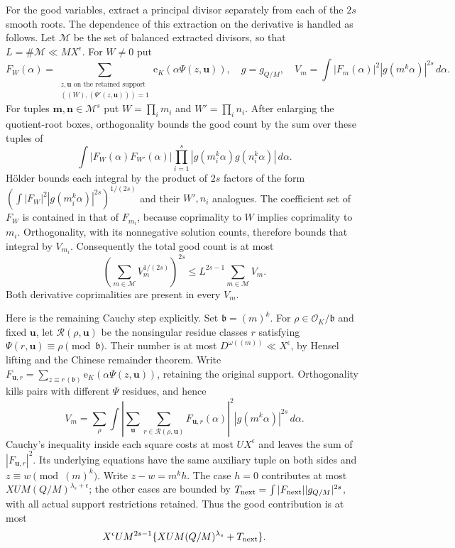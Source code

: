 \documentclass[11pt]{amsart}
\theoremstyle{definition}
\numberwithin{equation}{section}
\begin{document}
For the good variables, extract a principal divisor separately from each of the
$2s$ smooth roots.  The dependence of this extraction on the derivative is
handled as follows.  Let $\mathcal M$ be the set of balanced extracted divisors,
so that $L=\#\mathcal M\ll MX^\epsilon$.  For $W\ne0$ put
\[
 F_W(\alpha)=\sum_{\substack{z,\mathbf u\text{ on the retained support}\\
              ((W),(\Psi'(z,\mathbf u)))=1}}
       \mathrm e_K(\alpha\Psi(z,\mathbf u)),
 \quad g=g_{Q/M},\quad
 V_m=\int|F_m(\alpha)|^2|g(m^k\alpha)|^{2s}\,d\alpha.
\]
For tuples $\mathbf m,\mathbf n\in\mathcal M^s$ put
$W=\prod_i m_i$ and $W'=\prod_i n_i$.
After enlarging the quotient-root boxes, orthogonality bounds the good count by
the sum over these tuples of
\[
 \int |F_W(\alpha)F_{W'}(\alpha)|
       \prod_{i=1}^s|g(m_i^k\alpha)g(n_i^k\alpha)|\,d\alpha.
\]
H\"older bounds each integral by the product of $2s$ factors of the form
$(\int|F_W|^2|g(m_i^k\alpha)|^{2s})^{1/(2s)}$ and their $W',n_i$ analogues.
The coefficient set of $F_W$ is contained in that of $F_{m_i}$, because
coprimality to $W$ implies coprimality to $m_i$.  Orthogonality, with its
nonnegative solution counts, therefore bounds that integral by $V_{m_i}$.
Consequently the total good count is at most
\[
 \left(\sum_{m\in\mathcal M}V_m^{1/(2s)}\right)^{2s}
 \le L^{2s-1}\sum_{m\in\mathcal M}V_m.
\]
Both derivative coprimalities are present in every $V_m$.

Here is the remaining Cauchy step explicitly.  Set $\mathfrak b=(m)^k$.
For $\rho\in\mathcal O_K/\mathfrak b$ and fixed $\mathbf u$, let
$\mathcal R(\rho,\mathbf u)$ be the nonsingular residue classes $r$ satisfying
$\Psi(r,\mathbf u)\equiv\rho\pmod{\mathfrak b}$.
Their number is at most $D^{\omega((m))}\ll X^\epsilon$, by Hensel lifting
and the Chinese remainder theorem.  Write
$F_{\mathbf u,r}=\sum_{z\equiv r\, (\mathfrak b)}
\mathrm e_K(\alpha\Psi(z,\mathbf u))$, retaining the original support.
Orthogonality kills pairs with different $\Psi$ residues, and hence
\[
 V_m=\sum_\rho\int
 \left|\sum_{\mathbf u}\sum_{r\in\mathcal R(\rho,\mathbf u)}
                   F_{\mathbf u,r}(\alpha)\right|^2
 |g(m^k\alpha)|^{2s}\,d\alpha.
\]
Cauchy's inequality inside each square costs at most $UX^\epsilon$ and leaves
the sum of $|F_{\mathbf u,r}|^2$.  Its underlying equations have the same
auxiliary tuple on both sides and $z\equiv w\pmod{(m)^k}$.
Write $z-w=m^kh$.  The case $h=0$ contributes at most
$XUM(Q/M)^{\lambda_s+\epsilon}$; the other cases are bounded by
$T_{\rm next}=\int|F_{\rm next}||g_{Q/M}|^{2s}$, with all actual support
restrictions retained.  Thus the good contribution is at most
\[
 X^\epsilon U M^{2s-1}
 \{XUM(Q/M)^{\lambda_s}+T_{\rm next}\}.
\]
\end{document}
